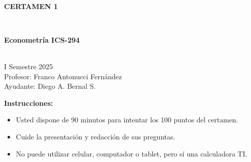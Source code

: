 \documentclass[10pt,a4paper]{article}
\begin{document}
\vspace{5cm}



\begin{center}
\begin{large}
\textbf{\\CERTAMEN 1}
\end{large}\\
\end{center}

\begin{center}
\begin{large}
\textbf{Econometría ICS-294}
\end{large}\\
\vspace{0.2cm}
I Semestre 2025\\
Profesor: Franco Antonucci Fernández\\
Ayudante: Diego A. Bernal S.
\end{center}

\textbf{Instrucciones:} 

\begin{itemize}

    \item Usted dispone de 90 minutos  para intentar los 100 puntos del certamen.
    \item Cuide la presentación y redacción de sus preguntas.
    \item No puede utilizar celular, computador o tablet, pero sí una calculadora TI.
     
\end{itemize}
\end{document}
